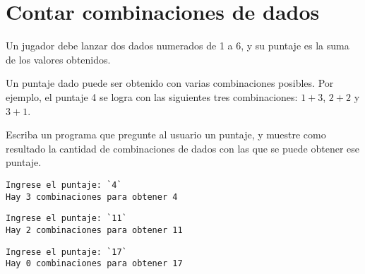 \section{Contar combinaciones de dados}

Un jugador debe lanzar dos dados numerados de 1 a 6, y su puntaje es la
suma de los valores obtenidos.

Un puntaje dado puede ser obtenido con varias combinaciones posibles.
Por ejemplo, el puntaje 4 se logra con las siguientes tres
combinaciones: \(1+3\), \(2+2\) y \(3+1\).

Escriba un programa que pregunte al usuario un puntaje,
y muestre como resultado la cantidad de combinaciones de dados
con las que se puede obtener ese puntaje.

\begin{lstlisting}[language=testcase]
Ingrese el puntaje: `4`
Hay 3 combinaciones para obtener 4
\end{lstlisting}

\begin{lstlisting}[language=testcase]
Ingrese el puntaje: `11`
Hay 2 combinaciones para obtener 11
\end{lstlisting}

\begin{lstlisting}[language=testcase]
Ingrese el puntaje: `17`
Hay 0 combinaciones para obtener 17
\end{lstlisting}

